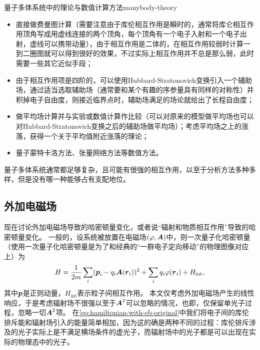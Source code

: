 \begin{back}{量子多体系统中的理论与数值计算方法}{manybody-theory}
    \begin{itemize}
        \item 直接做费曼图计算（需要注意由于库伦相互作用是瞬时的，通常将库仑相互作用顶角写成用虚线连接的两个顶角，每个顶角有一个电子入射和一个电子出射，虚线可以携带动量），由于相互作用是二体的，在相互作用较弱时计算一到二圈图就可以得到很好的效果，不过实际上相互作用并不总是那么弱，此时需要一些其它近似手段；
        \item 由于相互作用项是四阶的，可以使用Hubbard-Stratonovich变换引入一个辅助场，通过适当选取辅助场（通常要和某个有趣的序参量具有同样的对称性）并积掉电子自由度，则接近临界点时，辅助场满足的场论就给出了长程自由度；
        \item 做平均场计算并与实验或数值计算作比较（可以对原来的模型做平均场也可以对Hubbard-Stratonovich变换之后的辅助场做平均场）；考虑平均场之上的涨落，获得一个关于平均值附近涨落的理论；
        \item 量子蒙特卡洛方法、张量网络方法等数值方法。
    \end{itemize}

    量子多体系统通常都足够复杂，且可能有很强的相互作用，以至于分析方法多种多样，但是没有哪一种能够占有支配地位。
\end{back}

\subsection{外加电磁场}

现在讨论外加电磁场导致的哈密顿量变化，或者说“辐射和物质相互作用”导致的哈密顿量变化。
一般的，设系统被放置在电磁场$(\varphi, \vb*{A})$中，则一次量子化哈密顿量（使用一次量子化哈密顿量是为了和经典的“一群电子定向移动”的物理图像对应上）为
\begin{equation}
    {H} = \frac{1}{2m} \sum_i ({\vb*{p}_i} - q_i \vb*{A}({\vb*{r}_i}))^2 + \sum_i q_i \varphi({\vb*{r}}_i) + {H}_\text{int},
    \label{eq:hamiltonian-with-eb-original}
\end{equation}
其中$\vb*{p}$是正则动量，${H}_\text{int}$表示粒子间相互作用。
本文仅考虑外加电磁场产生的线性响应，于是考虑辐射场不很强以至于$\vb*{A}^2$可以忽略的情况，也即，仅保留单光子过程，忽略一切$\vb*{A}^2$项。
在\eqref{eq:hamiltonian-with-eb-original}中我们将电子间的库伦排斥能和辐射场引入的能量简单相加，因为这的确是两种不同的过程：库伦排斥涉及的光子实际上是不满足横场条件的虚光子，而辐射场中的光子都是可以出现在实际的物理态中的光子。

